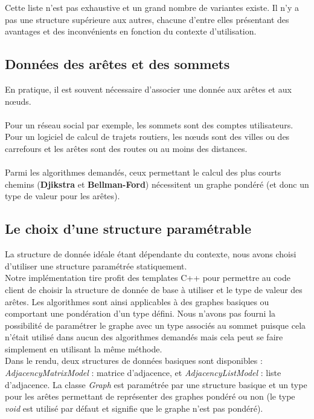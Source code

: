 \documentclass[12pt]{article}
\begin{document}
Cette liste n'est pas exhaustive et un grand nombre de variantes existe. Il n'y a pas une structure supérieure aux autres, chacune d'entre elles présentant des avantages et des inconvénients en fonction du contexte d'utilisation.

\clearpage
\subsection{Données des arêtes et des sommets}

En pratique, il est souvent nécessaire d'associer une donnée aux arêtes et aux nœuds. \\  \\
Pour un réseau social par exemple, les sommets sont des comptes utilisateurs. Pour un logiciel de calcul de trajets routiers, les nœuds sont des villes ou des carrefours et les arêtes sont des routes ou au moins des distances.\\ \\
Parmi les algorithmes demandés, ceux permettant le calcul des plus courts chemins ({\bf Djikstra} et {\bf Bellman-Ford}) nécessitent un graphe pondéré (et donc un type de valeur pour les arêtes).\\

\subsection{Le choix d'une structure paramétrable}
La structure de donnée idéale étant dépendante du contexte, nous avons choisi d'utiliser une structure paramétrée statiquement. \\ 

Notre implémentation tire profit des templates C++ pour permettre au code client de choisir la structure de donnée de base à utiliser et le type de valeur des arêtes. Les algorithmes sont ainsi applicables à des graphes basiques ou comportant une pondération d'un type défini. Nous n'avons pas fourni la possibilité de paramétrer le graphe avec un type associés au sommet puisque cela n'était utilisé dans aucun des algorithmes demandés mais cela peut se faire simplement en utilisant la même méthode.  \\ 

Dans le rendu, deux structures de données basiques sont disponibles : {\it AdjacencyMatrixModel} : matrice d'adjacence, et {\it AdjacencyListModel} : liste d'adjacence. La classe {\it Graph} est paramétrée par une structure basique et un type pour les arêtes permettant de représenter des graphes pondéré ou non (le type {\it void} est utilisé par défaut et signifie que le graphe n'est pas pondéré).  \\ 
\end{document}
